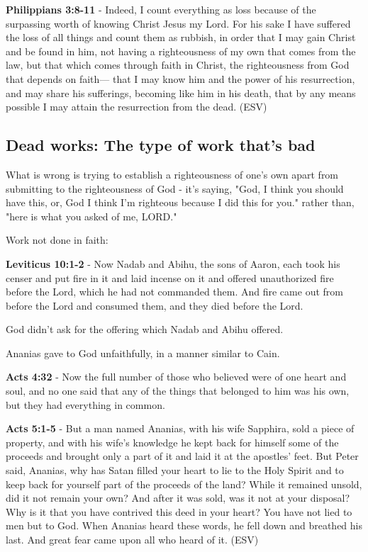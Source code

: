 \documentclass[11pt]{article}
\begin{document}
\textbf{Philippians 3:8-11} - Indeed, I count everything as loss because of the surpassing worth of knowing Christ Jesus my Lord. For his sake I have suffered the loss of all things and count them as rubbish, in order that I may gain Christ and be found in him, not having a righteousness of my own that comes from the law, but that which comes through faith in Christ, the righteousness from God that depends on faith— that I may know him and the power of his resurrection, and may share his sufferings, becoming like him in his death, that by any means possible I may attain the resurrection from the dead. (ESV)

\subsection{Dead works: The type of work that's bad}
\label{sec:org3c3fe04}
What is wrong is trying to establish a righteousness of one's own apart from submitting to the righteousness of God - it's saying, "God, I think you should have this, or, God I think I'm righteous because I did this for you." rather than, "here is what you asked of me, LORD."

Work not done in faith:

\textbf{Leviticus 10:1-2} - Now Nadab and Abihu, the sons of Aaron, each took his censer and put fire in it and laid incense on it and offered unauthorized fire before the Lord, which he had not commanded them. And fire came out from before the Lord and consumed them, and they died before the Lord.

God didn't ask for the offering which Nadab and Abihu offered.

Ananias gave to God unfaithfully, in a manner similar to Cain.

\textbf{Acts 4:32} - Now the full number of those who believed were of one heart and soul, and no one said that any of the things that belonged to him was his own, but they had everything in common.

\textbf{Acts 5:1-5} -  But a man named Ananias, with his wife Sapphira, sold a piece of property, and with his wife's knowledge he kept back for himself some of the proceeds and brought only a part of it and laid it at the apostles' feet.  But Peter said, Ananias, why has Satan filled your heart to lie to the Holy Spirit and to keep back for yourself part of the proceeds of the land?  While it remained unsold, did it not remain your own?  And after it was sold, was it not at your disposal?  Why is it that you have contrived this deed in your heart?  You have not lied to men but to God.  When Ananias heard these words, he fell down and breathed his last.  And great fear came upon all who heard of it.  (ESV)
\end{document}
